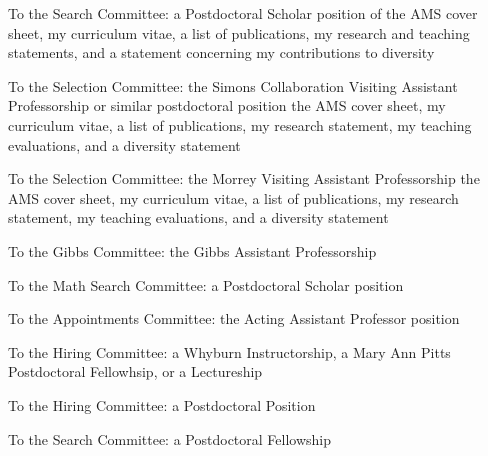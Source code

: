 \documentclass[11pt]{letter}
\begin{document}
\coverletter
	{\ucsd}
	{To the Search Committee:}
	{a Postdoctoral Scholar position}
	{\mathjobs}
	{}
	{}
	{of the AMS cover sheet, my curriculum vitae, a list of publications, my research and teaching statements, and a statement concerning my contributions to diversity}

\coverletter
  {\ucberkeley} %
  {To the Selection Committee:}
  {the Simons Collaboration Visiting Assistant Professorship or similar postdoctoral position}
  {\mathjobs}
  {}
  {}
  {the AMS cover sheet, my curriculum vitae, a list of publications, my research statement, my teaching evaluations, and a diversity statement}

\coverletter
  {\ucberkeley} %
  {To the Selection Committee:}
  {the Morrey Visiting Assistant Professorship}
  {\mathjobs}
  {}
  {}
  {the AMS cover sheet, my curriculum vitae, a list of publications, my research statement, my teaching evaluations, and a diversity statement}

\coverletter
  {\yale}
  {To the Gibbs Committee:}
  {the Gibbs Assistant Professorship}
  {\mathjobs}
  {}
  {}
  {\generic}

\coverletter
  {\wpi}
  {To the Math Search Committee:}
  {a Postdoctoral Scholar position}
  {\mathjobs}
  {}
  {}
  {\nopublications}

\coverletter
  {\uwash}
  {To the Appointments Committee:}
  {the Acting Assistant Professor position}
  {\mathjobs}
  {}
  {}
  {\nopublications}

\coverletter
  {\uvirginia}
  {To the Hiring Committee:}
  {a Whyburn Instructorship, a Mary Ann Pitts Postdoctoral Fellowhsip, or a Lectureship}
  {\mathjobs}
  {}
  {}
  {\generic}

\coverletter
  {\usflorida}
  {To the Hiring Committee:}
  {a Postdoctoral Position}
  {\mathjobs}
  {}
  {}
  {\noteachingnopub}

\coverletter
  {\umissouri}
  {To the Search Committee:}
  {a Postdoctoral Fellowship}
  {\mathjobs}
  {}
  {}
  {\nopublications}
\end{document}
